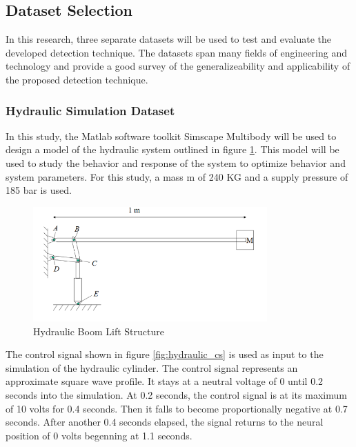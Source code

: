 \subsection{Dataset Selection}
\label{ref_datasets}

In this research, three separate datasets will be used to test and evaluate the developed detection technique. The datasets span many fields of engineering and technology and provide a good survey of the generalizeability and applicability of the proposed detection technique.  

\subsubsection{Hydraulic Simulation Dataset}
\label{ref_hydraulic_dataset}

In this study, the Matlab software toolkit Simscape Multibody will be used to design a model of the hydraulic system outlined in figure \ref{fig:boom_structure}. This model will be used to study the behavior and response of the system to optimize behavior and system parameters. For this study, a mass m of 240 KG and a supply pressure of 185 bar is used.

\begin{figure}[H]
    \includegraphics[width=0.8\textwidth]{1_hydraulic_sim/BoomStructure.PNG}
    \caption{Hydraulic Boom Lift Structure}
    \label{fig:boom_structure}
\end{figure}


The control signal shown in figure \ref{fig:hydraulic_cs} is used as input to the simulation of the hydraulic cylinder. The control signal represents an approximate square wave profile. It stays at a neutral voltage of 0 until 0.2 seconds into the simulation. At 0.2 seconds, the control signal is at its maximum of 10 volts for 0.4 seconds. Then it falls to become proportionally negative at 0.7 seconds. After another 0.4 seconds elapsed, the signal returns to the neural position of 0 volts begenning at 1.1 seconds. 

